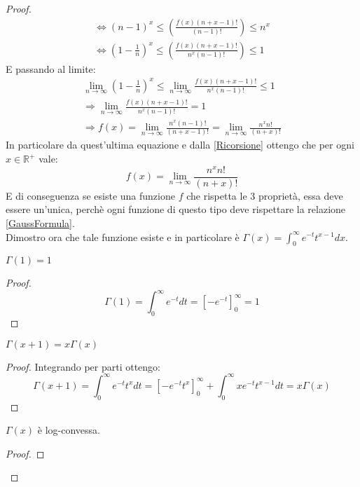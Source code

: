 \begin{proof}
\begin{gather*}
  \iff (n-1)^x \le \left( \frac{f(x)(n+x-1)!}{(n-1)!} \right) \le n^x \\
  \iff \left(1-\frac{1}{n}\right)^x \le \left( \frac{f(x)(n+x-1)!}{n^x(n-1)!} \right) \le 1
\end{gather*}
E passando al limite:
 \begin{gather*}
  \lim_{n\rightarrow \infty} \left(1-\frac{1}{n}\right)^x \le \lim_{n\rightarrow \infty}  \frac{f(x)(n+x-1)!}{n^x(n-1)!} \le 1 \\
  \Longrightarrow \lim_{n\rightarrow \infty} \frac{f(x)(n+x-1)!}{n^x(n-1)!}  = 1 \\
  \Longrightarrow f(x) = \lim_{n\rightarrow \infty} \frac{n^x(n-1)!}{(n+x-1)!}=\lim_{n\rightarrow \infty} \frac{n^xn!}{(n+x)!}
 \end{gather*}
In particolare da quest'ultima equazione e dalla \cref{Ricorsione} ottengo che per ogni $x\in\mathbb{R}^+$ vale:
\begin{equation}
\label{GaussFormula}
 f(x)=\lim_{n\rightarrow \infty} \frac{n^xn!}{(n+x)!}
\end{equation}
E di conseguenza se esiste una funzione $f$ che rispetta le 3 proprietà, essa deve essere un'unica, perchè ogni
funzione di questo tipo deve rispettare la relazione \cref{GaussFormula}.\\
Dimostro ora che tale funzione esiste e in particolare è 
$\Gamma(x)=\int_0^{\infty}{e^{-t}t^{x-1}dx}$.
\begin{lemma}
 $\Gamma(1)=1$
\end{lemma}
\begin{proof}
       \begin{equation*}
       \Gamma(1)=\int_0^{\infty}{e^{-t}dt}=\left[-e^{-t}\right]_0^{\infty}=1
       \end{equation*}
\end{proof}
\begin{lemma}
 $\Gamma(x+1)=x\Gamma(x)$
\end{lemma}
\begin{proof}
       Integrando per parti ottengo:
       \begin{equation*} 
       \Gamma(x+1)=\int_0^{\infty}{e^{-t}t^xdt}=\left[-e^{-t}t^x\right]_0^{\infty}+\int_0^{\infty}xe^{-t}t^{x-1}dt=x\Gamma(x)
       \end{equation*}
\end{proof}
\begin{lemma}
 \label{GammaLogConvessa}
 $\Gamma(x)$ è log-convessa.
\end{lemma}
\begin{proof}

\end{proof}
\end{proof}
